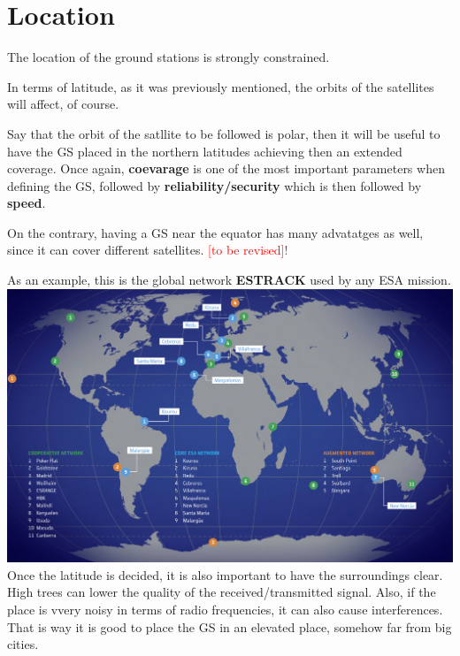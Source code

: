 \documentclass[12pt,a4paper]{article}
\begin{document}
\section{Location}

The location of the ground stations is strongly constrained. 
\newline

In terms of latitude, as it was previously mentioned, the orbits of the satellites will affect, of course.

Say that the orbit of the satllite to be followed is polar, then it will be useful to have the GS placed in the northern latitudes achieving then an extended coverage. Once again, \textbf{coevarage} is one of the most important parameters when defining the GS, followed by \textbf{reliability/security} which is then followed  by \textbf{speed}.

On the contrary, having a GS near the equator has many advatatges as well, since it can cover different satellites. \textcolor{red}{[to be revised]!}

As an example, this is the global network \textbf{ESTRACK} used by any ESA mission.
\newline
\includegraphics[scale=0.6]{./img/Network_map}
\newline
\newline
Once the latitude is decided, it is also important to have the surroundings clear. High trees can lower the quality of the received/transmitted signal. Also, if the place is vvery noisy in terms of radio frequencies, it can also cause interferences.
That is way it is good to place the GS in an elevated place, somehow far from big cities.
\end{document}
